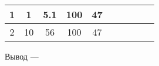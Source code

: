 \begin{table}[h]
\begin{tabular}{|c|cc|cc|c|cc|cc|}
1                  & \multicolumn{1}{c|}{1}                                                    & 5.1                                                  & \multicolumn{1}{c|}{100}                                                  & 47                                                   &                                                                              & \multicolumn{1}{c|}{}                                                                &                                                                    & \multicolumn{1}{c|}{}                                                                &                                                                    \\ \hline
2                  & \multicolumn{1}{c|}{10}                                                   & 56                                                   & \multicolumn{1}{c|}{100}                                                  & 47                                                   &                                                                              & \multicolumn{1}{c|}{}                                                                &                                                                    & \multicolumn{1}{c|}{}                                                                &                                                                    \\ \hline
\end{tabular}
\end{table}

Вывод --- \hrulefill

\hrulefill

\hrulefill
\newpage
